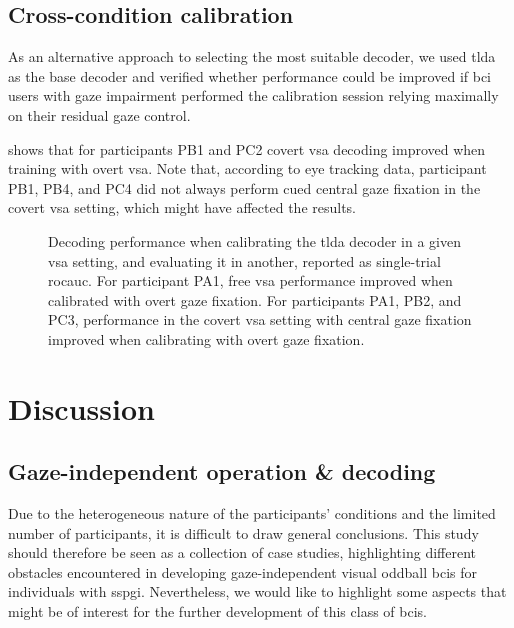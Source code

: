 \documentclass[twocolumn]{article}
\begin{document}
\subsection{Cross-condition calibration}
\label{sec:patients/outcomes/cross}

As an alternative approach to selecting the most suitable decoder, we used
\ac{tlda} as the base decoder and verified whether performance could be improved
if \ac{bci} users with gaze impairment performed the calibration session relying
maximally on their residual gaze control.

 shows that for participants PB1 and PC2 covert \ac{vsa} decoding
improved when training with overt \ac{vsa}.
Note that, according to eye tracking data, participant PB1, PB4, and PC4 did not
always perform cued central gaze fixation in the covert \ac{vsa} setting,
which might have affected the results.
\begin{figure}[t]
  
  \caption[Cross-setting calibration and decoding performance.]{
    Decoding performance when calibrating the \ac{tlda} decoder in a given \ac{vsa}
    setting, and evaluating it in another, reported as
    single-trial \ac{rocauc}.
    For participant PA1, free \ac{vsa} performance improved when
    calibrated with overt gaze fixation.
    For participants PA1, PB2, and PC3, performance in the covert \ac{vsa} setting with central gaze fixation
    improved when calibrating with overt gaze fixation.
  }
  \label{fig:patients/cross}
\end{figure}

\section{Discussion}


\subsection{Gaze-independent operation \& decoding}
Due to the heterogeneous nature of the participants' conditions and the limited
number of participants, it is difficult to draw general conclusions.
This study should therefore be seen as a collection of case studies,
highlighting different obstacles encountered in developing gaze-independent
visual oddball \acp{bci} for individuals with \ac{sspgi}.
Nevertheless, we would like to highlight some aspects that might be
of interest for the further development of this class of \acp{bci}.
\end{document}
